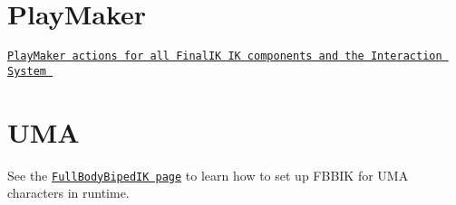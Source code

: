 \hypertarget{page15_PlayMaker}{}\section{Play\+Maker}\label{page15_PlayMaker}
\href{http://www.root-motion.com/3rdpartysupport/Playmaker.unitypackage}{\tt Play\+Maker actions for all Final\+IK IK components and the Interaction System }\hypertarget{page15_UMA}{}\section{U\+MA}\label{page15_UMA}
See the \href{http://www.root-motion.com/finalikdox/html/page6.html}{\tt Full\+Body\+Biped\+IK page} to learn how to set up F\+B\+B\+IK for U\+MA characters in runtime. 